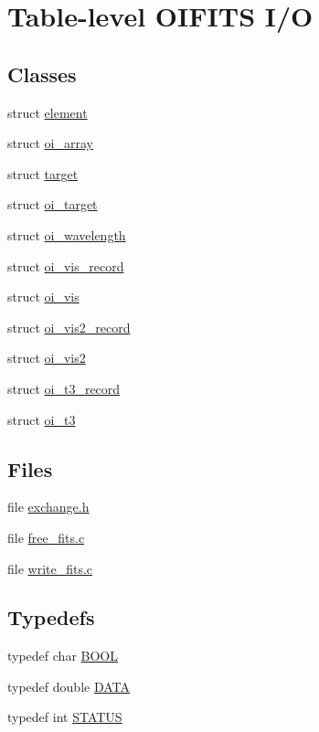 \hypertarget{group__oitable}{
\section{Table-\/level OIFITS I/O}
\label{group__oitable}
}
\subsection*{Classes}
\begin{DoxyCompactItemize}
\item 
struct \hyperlink{structelement}{element}
\item 
struct \hyperlink{structoi__array}{oi\_\-array}
\item 
struct \hyperlink{structtarget}{target}
\item 
struct \hyperlink{structoi__target}{oi\_\-target}
\item 
struct \hyperlink{structoi__wavelength}{oi\_\-wavelength}
\item 
struct \hyperlink{structoi__vis__record}{oi\_\-vis\_\-record}
\item 
struct \hyperlink{structoi__vis}{oi\_\-vis}
\item 
struct \hyperlink{structoi__vis2__record}{oi\_\-vis2\_\-record}
\item 
struct \hyperlink{structoi__vis2}{oi\_\-vis2}
\item 
struct \hyperlink{structoi__t3__record}{oi\_\-t3\_\-record}
\item 
struct \hyperlink{structoi__t3}{oi\_\-t3}
\end{DoxyCompactItemize}
\subsection*{Files}
\begin{DoxyCompactItemize}
\item 
file \hyperlink{exchange_8h}{exchange.h}
\item 
file \hyperlink{free__fits_8c}{free\_\-fits.c}
\item 
file \hyperlink{write__fits_8c}{write\_\-fits.c}
\end{DoxyCompactItemize}
\subsection*{Typedefs}
\begin{DoxyCompactItemize}
\item 
typedef char \hyperlink{group__oitable_gaf492d2bddcb2befacb3aa03dcdf9aafd}{BOOL}
\item 
typedef double \hyperlink{group__oitable_gaad99e8bad1a589e9f406f33403d42ca7}{DATA}
\item 
typedef int \hyperlink{group__oitable_ga0cb9c7fae5afe4237eb4d5d43318fa18}{STATUS}
\end{DoxyCompactItemize}
